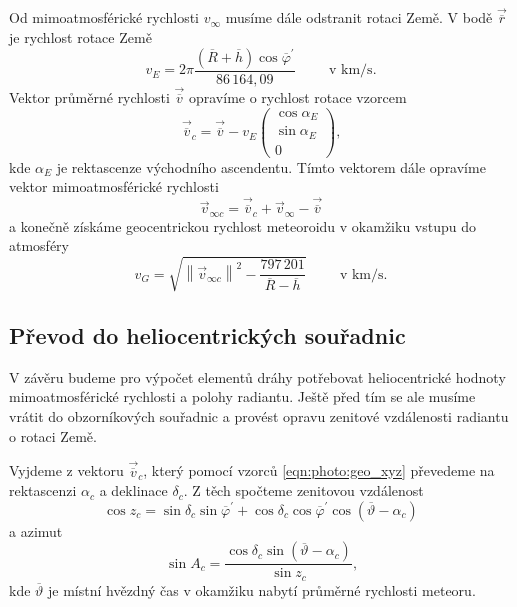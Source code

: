 Od mimoatmosférické rychlosti $v_\infty$ musíme dále odstranit rotaci Země. V bodě $\vec{\overline{r}}$ je rychlost rotace Země \cite{ceplecha}
\begin{equation}
    v_E=2\pi\frac{(\overline{R}+\overline{h})\cos{\overline{\varphi}^\prime}}{86\,164{,}09}\hspace{1cm}\text{v km/s.}
\end{equation}
Vektor průměrné rychlosti $\vec{\overline{v}}$ opravíme o rychlost rotace vzorcem \cite{ceplecha}
\begin{equation}
    \vec{\overline{v}}_c=\vec{\overline{v}}-v_E\begin{pmatrix}
        \cos{\alpha_E} \\
        \sin{\alpha_E} \\
        0
    \end{pmatrix}\text{,}
\end{equation}
kde $\alpha_E$ je rektascenze východního ascendentu. Tímto vektorem dále opravíme vektor mimoatmosférické rychlosti \cite{ceplecha}
\begin{equation}
    \vec{v}_{\infty c}=\vec{\overline{v}}_c+\vec{v}_\infty-\vec{\overline{v}}
\end{equation}
a konečně získáme geocentrickou rychlost meteoroidu v okamžiku vstupu do atmosféry \cite{ceplecha}
\begin{equation}
    v_G=\sqrt{
        \left\lVert\vec{v}_{\infty c}\right\rVert^2-
        \frac{797\,201}{\overline{R}-\overline{h}}
    }\hspace{1cm}\text{v km/s.}
\end{equation}

\subsection{Převod do heliocentrických souřadnic}
V závěru budeme pro výpočet elementů dráhy potřebovat heliocentrické hodnoty mimoatmosférické rychlosti a polohy radiantu. Ještě před tím se ale musíme vrátit do obzorníkových souřadnic a provést opravu zenitové vzdálenosti radiantu o rotaci Země.

Vyjdeme z vektoru $\vec{\overline{v}}_c$, který pomocí vzorců \eqref{eqn:photo:geo_xyz} převedeme na rektascenzi $\alpha_c$ a deklinace $\delta_c$. Z těch spočteme zenitovou vzdálenost \cite{ceplecha}
\begin{equation}
    \cos{z_c}=\sin{\delta_c}\sin{\overline{\varphi}^\prime}+\cos{\delta_c}\cos{\overline{\varphi}^\prime}\cos{(\overline{\vartheta}-\alpha_c)}
\end{equation}
a azimut
\begin{equation}
    \sin{A_c}=\frac{\cos{\delta_c}\sin{(\overline{\vartheta}-\alpha_c)}}{\sin{z_c}}\text{,}
\end{equation}
kde $\overline{\vartheta}$ je místní hvězdný čas v okamžiku nabytí průměrné rychlosti meteoru.

